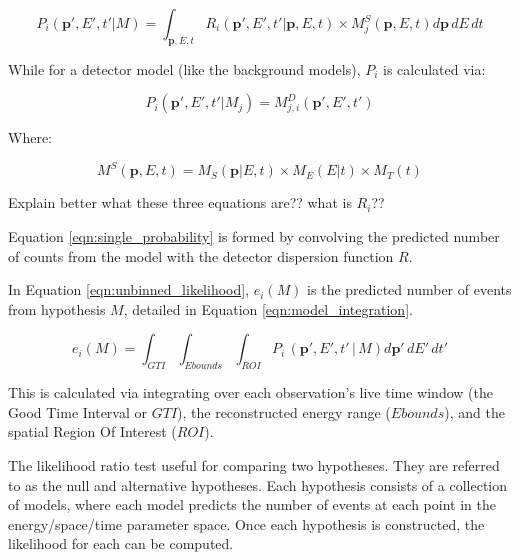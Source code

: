   \begin{equation}\label{eqn:single_probability}
    P_i \left ( \boldsymbol{p}', E', t' | M \right ) = \int_{ \boldsymbol{p},E,t} R_i \left( \boldsymbol{p}',E',t'| \boldsymbol{p},E,t \right ) \times M_j^S \left( \boldsymbol{p}, E, t \right ) d\boldsymbol{p} \, dE \, dt
  \end{equation}
  
  While for a detector model (like the background models), $P_i$ is calculated via:
  
  \begin{equation}
    P_i \left ( \boldsymbol{p}', E', t' | M_j \right ) = M^D_{j,i} \left ( \boldsymbol{p}', E', t' \right )
  \end{equation}
  
  Where:

  \begin{equation}
    M^S \left ( \boldsymbol{p}, E, t \right ) = M_S \left ( \boldsymbol{p}|E,t \right ) \times M_E \left ( E | t \right ) \times M_T \left ( t \right )
  \end{equation}
  
  {\color{red} Explain better what these three equations are??  what is $R_i$??}
  
  Equation \ref{eqn:single_probability} is formed by convolving the predicted number of counts from the model with the detector dispersion function $R$.
  
  In Equation \ref{eqn:unbinned_likelihood}, $e_i \left ( M \right )$ is the predicted number of events from hypothesis $M$, detailed in Equation \ref{eqn:model_integration}.

  \begin{equation}\label{eqn:model_integration}
    e_i \left(M \right ) = \int_{GTI} \int_{Ebounds} \int_{ROI} P_i \, \left( \boldsymbol{p}', E', t' \, | \, M \right ) d\boldsymbol{p}' \, dE' \, dt'
  \end{equation}
  
  This is calculated via integrating over each observation's live time window (the Good Time Interval or $GTI$), the reconstructed energy range ($Ebounds$), and the spatial Region Of Interest ($ROI$).
  
  
  The likelihood ratio test useful for comparing two hypotheses.
  They are referred to as the null and alternative hypotheses.
  Each hypothesis consists of a collection of models, where each model predicts the number of events at each point in the energy/space/time parameter space.
  Once each hypothesis is constructed, the likelihood for each can be computed.
  
